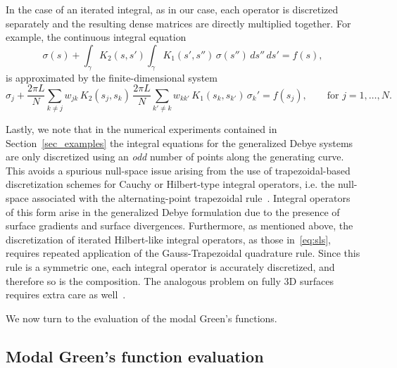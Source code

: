 \documentclass[11pt]{article}
\numberwithin{equation}{section}
\begin{document}
In the case of an iterated integral, as in our case, each operator is
discretized separately and the resulting dense matrices are directly
multiplied together. For example, the continuous integral equation
\begin{equation}
  \sigma(s) + \int_\gamma K_2(s,s') \int_\gamma K_1(s',s'') \,
  \sigma(s'') \, ds'' \, ds' = f(s),
\end{equation}
is approximated by the finite-dimensional system
\begin{equation}
  \sigma_j + \frac{2\pi L}{N} \sum_{k\neq j} w_{jk} \, K_2(s_j,s_k) \, 
  \frac{2\pi L}{N} \sum_{k'\neq k} w_{kk'} \, K_1(s_k,s_{k'}) \, \sigma_k'=
  f(s_j), \qquad \text{for } j = 1,\ldots,N.
\end{equation}

Lastly, we note that in the numerical experiments contained in
Section~\ref{sec_examples} the integral equations for the generalized
Debye systems are only discretized using an \emph{odd} number of
points along the generating curve.
This avoids a spurious null-space issue arising
from the use of trapezoidal-based discretization schemes for Cauchy or
Hilbert-type integral operators, i.e. the null-space associated with
the alternating-point trapezoidal rule~\cite{sidi1988}.
Integral operators of this form arise
in the generalized Debye formulation due to the presence of surface
gradients and surface divergences. Furthermore, as mentioned above,
the discretization of iterated Hilbert-like integral operators, as
those in~\eqref{eq:sls}, requires repeated application of the
Gauss-Trapezoidal quadrature rule. Since this rule is a symmetric one,
each integral operator is accurately discretized, and therefore so is
the composition.
The analogous problem on fully 3D
surfaces requires extra care as well~\cite{bremer_2013}.

We now turn to the evaluation of the modal Green's functions.





\subsection{Modal Green's function evaluation}
\label{sec_greens}
\end{document}
